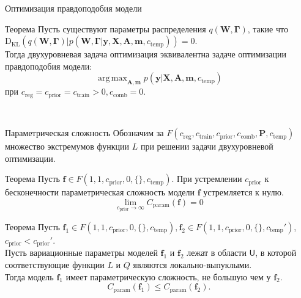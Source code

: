 \documentclass[usenames,dvipsnames,11pt,pdf,utf8,russian,aspectratio=169]{beamer}
\DeclareMathOperator*{\argmax}{arg\,max}
\begin{document}
\begin{frame}{Оптимизация правдоподобия модели}
\begin{block}{Теорема}
Пусть существуют параметры распределения $q(\mathbf{W}, \boldsymbol{\Gamma})$, такие что $\text{D}_\text{KL}(q(\mathbf{W}, \boldsymbol{\Gamma})|p(\mathbf{W},  \boldsymbol{\Gamma}| \mathbf{y}, \mathbf{X}, \mathbf{A}, \mathbf{m}, c_\text{temp})) = 0$.\\
Тогда двухуровневая задача оптимизация эквивалентна задаче оптимизации правдоподобия модели:
$$\argmax_{\mathbf{A}, \mathbf{m}}  p(\mathbf{y}|\mathbf{X},\mathbf{A},\mathbf{m}, c_{\text{temp}})$$ 
при $c_{\text{reg}} = c_{\text{prior}} = c_{\text{train}} >0, c_{\text{comb}} = 0$. 
\end{block}
~\\

\end{frame}

\begin{frame}{Параметрическая сложность}
\small
Обозначим за $F(c_{\text{reg}}, c_{\text{train}}, c_{\text{prior}}, c_{\text{comb}}, \mathbf{P}, c_{\text{temp}})$ множество экстремумов функции $L$ при решении задачи двухуровневой оптимизации.
\begin{block}{Теорема}
Пусть $\mathbf{f} \in F(1, 1, c_{\text{prior}}, 0, \{\},  c_{\text{temp}} )$.
При устремлении $ c_{\text{prior}}$ к бесконечности параметрическая сложность модели $\mathbf{f}$ устремляется к нулю.
\[
    \lim_{c_{\text{prior}} \to \infty} C_{\text{param}}(\mathbf{f}) = 0
\]
\end{block}

\begin{block}{Теорема}
Пусть $\mathbf{f}_1 \in F(1, 1, c_{\text{prior}}, 0, \{\},  c_{\text{temp}} ), \mathbf{f}_2 \in F(1, 1, c_{\text{prior}}, 0, \{\},  c_{\text{temp}}' )$, $c_{\text{prior}} < c_{\text{prior}}'$.\\
Пусть вариационные параметры моделей $\mathbf{f}_1$ и $\mathbf{f}_2$ лежат в области $\mathsf{U}$, в которой соответствующие функции $L$ и $Q$ являются локально-выпуклыми.\\ 
Тогда модель $\mathbf{f}_1$ имеет параметрическую сложность, не большую чем у $\mathbf{f}_2$.
\[
    C_\text{param}(\mathbf{f}_1) \leq C_\text{param}(\mathbf{f}_2).
\]
\end{block}


\end{frame}
\end{document}
